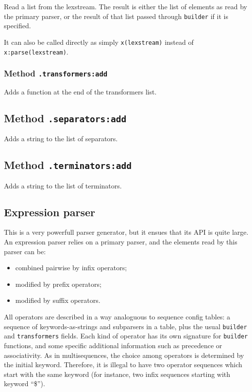 Read a list from the lexstream. The result is either the list of elements
as read by the primary parser, or the result of that list passed
through \verb|builder| if it is specified.

It can also be called directly as simply \verb|x(lexstream)| instead of
\verb|x:parse(lexstream)|.

\subsubsection{Method {\tt .transformers:add}}
Adds a function at the end of the transformers list.

\subsection{Method {\tt .separators:add}}
Adds a string to the list of separators.

\subsection{Method {\tt .terminators:add}}
Adds a string to the list of terminators.

\subsection{Expression parser}

This is a very powerfull parser generator, but it ensues that its API
is quite large. An expression parser relies on a primary parser, and
the elements read by this parser can be:
\begin{itemize}
\item combined pairwise by infix operators;
\item modified by prefix operators;
\item modified by suffix operators.
\end{itemize}

All operators are described in a way analoguous to sequence config
tables: a sequence of keywords-as-strings and subparsers in a table,
plus the usual \verb|builder| and \verb|transformers|
fields. Each kind of operator has its own signature for \verb|builder|
functions, and some specific additional information such as precedence
or associativity. As in multisequences, the choice among operators is
determined by the initial keyword. Therefore, it is illegal to have
two operator sequences which start with the same keyword (for
instance, two infix sequences starting with keyword ``\$'').

